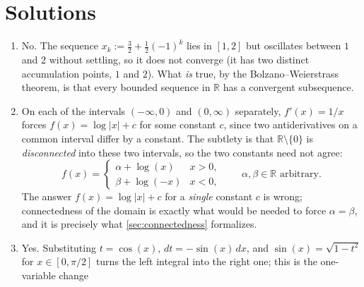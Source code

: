 \section{Solutions}
\label{sec:prerequisites_solutions}


\begin{exercisesolution}
\label{sol:analysis1_recap}
\begin{enumerate}[label=\textbf{(\alph*)}]
  \item No. The sequence $x_k := \tfrac{3}{2} + \tfrac{1}{2}(-1)^k$ lies in $[1,2]$ but
    oscillates between $1$ and $2$ without settling, so it does not converge (it has two distinct
    accumulation points, $1$ and $2$). What \emph{is} true, by the Bolzano--Weierstrass theorem, is
    that every bounded sequence in $\mathbb{R}$ has a convergent subsequence.
  \item On each of the intervals $(-\infty,0)$ and $(0,\infty)$ separately, $f'(x) = 1/x$ forces
    $f(x) = \log|x| + c$ for some constant $c$, since two antiderivatives on a common interval
    differ by a constant. The subtlety is that $\mathbb{R}\setminus\{0\}$ is \emph{disconnected}
    into these two intervals, so the two constants need not agree:
    \[
      f(x) =
      \begin{cases}
        \alpha + \log(x) & x > 0, \\
        \beta + \log(-x) & x < 0,
      \end{cases}
      \qquad \alpha, \beta \in \mathbb{R} \text{ arbitrary}.
    \]
    The answer $f(x) = \log|x| + c$ for a \emph{single} constant $c$ is wrong; connectedness of
    the domain is exactly what would be needed to force $\alpha = \beta$, and it is precisely
    what \cref{sec:connectedness} formalizes.
  \item Yes. Substituting $t = \cos(x)$, $dt = -\sin(x)\,dx$, and $\sin(x) = \sqrt{1-t^2}$ for
    $x \in [0,\pi/2]$ turns the left integral into the right one; this is the one-variable change

\end{enumerate}
\end{exercisesolution}
